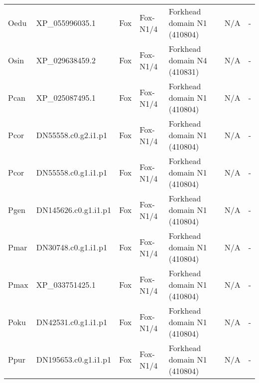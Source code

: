 \documentclass[../main.tex]{subfiles}
\begin{document}
\begin{landscape}
\begin{longtable}{lllllll}
		Oedu           & XP\_055996035.1       & Fox            & Fox-N1/4            & Forkhead domain N1 (410804)                 & N/A                                                                    & -                    \\
		Osin           & XP\_029638459.2       & Fox            & Fox-N1/4            & Forkhead domain N4 (410831)                 & N/A                                                                    & -                    \\
		Pcan           & XP\_025087495.1       & Fox            & Fox-N1/4            & Forkhead domain N1 (410804)                 & N/A                                                                    & -                    \\
		Pcor           & DN55558.c0.g2.i1.p1   & Fox            & Fox-N1/4            & Forkhead domain N1 (410804)                 & N/A                                                                    & -                    \\
		Pcor           & DN55558.c0.g1.i1.p1   & Fox            & Fox-N1/4            & Forkhead domain N1 (410804)                 & N/A                                                                    & -                    \\
		Pgen           & DN145626.c0.g1.i1.p1  & Fox            & Fox-N1/4            & Forkhead domain N1 (410804)                 & N/A                                                                    & -                    \\
		Pmar           & DN30748.c0.g1.i1.p1   & Fox            & Fox-N1/4            & Forkhead domain N1 (410804)                 & N/A                                                                    & -                    \\
		Pmax           & XP\_033751425.1       & Fox            & Fox-N1/4            & Forkhead domain N1 (410804)                 & N/A                                                                    & -                    \\
		Poku           & DN42531.c0.g1.i1.p1   & Fox            & Fox-N1/4            & Forkhead domain N1 (410804)                 & N/A                                                                    & -                    \\
		Ppur           & DN195653.c0.g1.i1.p1  & Fox            & Fox-N1/4            & Forkhead domain N1 (410804)                 & N/A                                                                    & -                    \\

\end{longtable}
\end{landscape}
\end{document}
